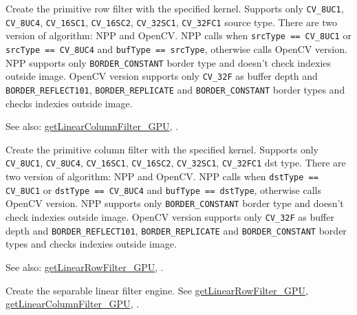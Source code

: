 \label{cppfunc.gpu.getLinearRowFilter}
Create the primitive row filter with the specified kernel.
Supports only \texttt{CV\_8UC1}, \texttt{CV\_8UC4}, \texttt{CV\_16SC1}, \texttt{CV\_16SC2}, \texttt{CV\_32SC1}, \texttt{CV\_32FC1} source type. There are two version of algorithm: NPP and OpenCV. NPP calls when \texttt{srcType == CV\_8UC1} or \texttt{srcType == CV\_8UC4} and \texttt{bufType == srcType}, otherwise calls OpenCV version. NPP supports only \texttt{BORDER\_CONSTANT} border type and doesn't check indexies outside image. OpenCV version supports only \texttt{CV\_32F} as buffer depth and \texttt{BORDER\_REFLECT101}, \texttt{BORDER\_REPLICATE} and \texttt{BORDER\_CONSTANT} border types and checks indexies outside image.

See also: \hyperref[cppfunc.gpu.getLinearColumnFilter]{getLinearColumnFilter\_GPU}, .

\label{cppfunc.gpu.getLinearColumnFilter}
Create the primitive column filter with the specified kernel.
Supports only \texttt{CV\_8UC1}, \texttt{CV\_8UC4}, \texttt{CV\_16SC1}, \texttt{CV\_16SC2}, \texttt{CV\_32SC1}, \texttt{CV\_32FC1} dst type. There are two version of algorithm: NPP and OpenCV. NPP calls when \texttt{dstType == CV\_8UC1} or \texttt{dstType == CV\_8UC4} and \texttt{bufType == dstType}, otherwise calls OpenCV version. NPP supports only \texttt{BORDER\_CONSTANT} border type and doesn't check indexies outside image. OpenCV version supports only \texttt{CV\_32F} as buffer depth and \texttt{BORDER\_REFLECT101}, \texttt{BORDER\_REPLICATE} and \texttt{BORDER\_CONSTANT} border types and checks indexies outside image.

See also: \hyperref[cppfunc.gpu.getLinearRowFilter]{getLinearRowFilter\_GPU}, .

\label{cppfunc.gpu.createSeparableLinearFilter}
Create the separable linear filter engine.
See \hyperref[cppfunc.gpu.getLinearRowFilter]{getLinearRowFilter\_GPU}, \hyperref[cppfunc.gpu.getLinearColumnFilter]{getLinearColumnFilter\_GPU}, .

